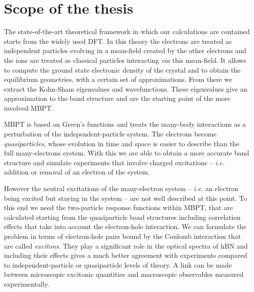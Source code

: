 




\section*{Scope of the thesis}
%
The state-of-the-art theoretical framework in which our calculations are contained starts from the widely used \acrfull{DFT}.\cite{kohn1996density} In this theory the electrons are treated as independent particles evolving in a mean-field created by the other electrons and the ions are treated as classical particles interacting \textit{via} this mean-field. It allows to compute the ground state electronic density of the crystal and to obtain the equilibrium geometries, with a certain set of approximations. From there we extract the Kohn-Sham eigenvalues and wavefunctions. These eigenvalues give an approximation to the band structure and are the starting point of the more involved \acrfull{MBPT}. 

\acrshort{MBPT} is based on Green's functions and treats the many-body interactions as a perturbation of the independent-particle system. The electrons become \textit{quasiparticles}, whose evolution in time and space is easier to describe than the full many-electrons system.\cite{hedin1965new,aryasetiawan1998gw}
With this we are able to obtain a more accurate band structure and simulate experiments that involve charged excitations -- \textit{i.e.} addition or removal of an electron of the system. 

However the neutral excitations of the many-electron system -- \textit{i.e.} an electron being excited but staying in the system -- are not well described at this point. To this end we need the two-particle response functions within \acrshort{MBPT}, that are calculated starting from the quasiparticle band structures including correlation effects that take into account the electron-hole interaction. We can formulate the problem in terms of electron-hole pairs bound by the Coulomb interaction that are called \textit{excitons}. They play a significant role in the optical spectra of \acrshort{hBN} and including their effects gives a much better agreement with experiments compared to independent-particle or quasiparticle levels of theory.
A link can be made between microscopic excitonic quantities and macroscopic observables measured experimentally.\cite{martin2016interacting} 

